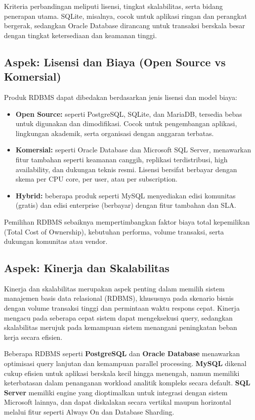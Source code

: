 Kriteria perbandingan meliputi lisensi, tingkat skalabilitas, serta bidang penerapan utama. SQLite, misalnya, cocok untuk aplikasi ringan dan perangkat bergerak, sedangkan Oracle Database dirancang untuk transaksi berskala besar dengan tingkat ketersediaan dan keamanan tinggi.

\subsection{Aspek: Lisensi dan Biaya (Open Source vs Komersial)}

Produk RDBMS dapat dibedakan berdasarkan jenis lisensi dan model biaya:

\begin{itemize}
	\item \textbf{Open Source:} seperti PostgreSQL, SQLite, dan MariaDB, tersedia bebas untuk digunakan dan dimodifikasi. Cocok untuk pengembangan aplikasi, lingkungan akademik, serta organisasi dengan anggaran terbatas.
	\item \textbf{Komersial:} seperti Oracle Database dan Microsoft SQL Server, menawarkan fitur tambahan seperti keamanan canggih, replikasi terdistribusi, high availability, dan dukungan teknis resmi. Lisensi bersifat berbayar dengan skema per CPU core, per user, atau per subscription.
	\item \textbf{Hybrid:} beberapa produk seperti MySQL menyediakan edisi komunitas (gratis) dan edisi enterprise (berbayar) dengan fitur tambahan dan SLA.
\end{itemize}

Pemilihan RDBMS sebaiknya mempertimbangkan faktor biaya total kepemilikan (Total Cost of Ownership), kebutuhan performa, volume transaksi, serta dukungan komunitas atau vendor.

\subsection{Aspek: Kinerja dan Skalabilitas}

Kinerja dan skalabilitas merupakan aspek penting dalam memilih sistem manajemen basis data relasional (RDBMS), khususnya pada skenario bisnis dengan volume transaksi tinggi dan permintaan waktu respons cepat. Kinerja mengacu pada seberapa cepat sistem dapat mengeksekusi query, sedangkan skalabilitas merujuk pada kemampuan sistem menangani peningkatan beban kerja secara efisien.

Beberapa RDBMS seperti \textbf{PostgreSQL} dan \textbf{Oracle Database} menawarkan optimisasi query lanjutan dan kemampuan parallel processing. \textbf{MySQL} dikenal cukup efisien untuk aplikasi berskala kecil hingga menengah, namun memiliki keterbatasan dalam penanganan workload analitik kompleks secara default. \textbf{SQL Server} memiliki engine yang dioptimalkan untuk integrasi dengan sistem Microsoft lainnya, dan dapat diskalakan secara vertikal maupun horizontal melalui fitur seperti Always On dan Database Sharding.

